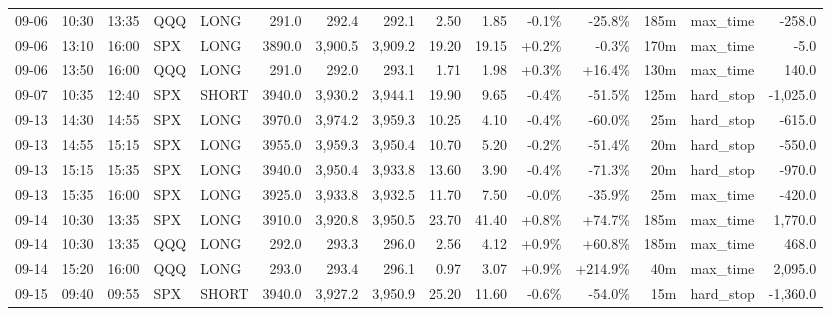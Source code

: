 \documentclass[11pt,a4paper,twoside]{article}
\begin{document}
\begin{landscape}
\begin{center}
\begin{longtable}{>{\color{txtmain}}l l l l l r r r r r r r r >{\color{txtmain}}l r}
09-06 & 10:30 & 13:35 & QQQ & LONG & 291.0 & 292.4 & 292.1 & 2.50 & 1.85 & \textcolor{lossred}{-0.1\%} & \textcolor{lossred}{-25.8\%} & 185m & max\_time & \textcolor{lossred}{-258.0} \\
09-06 & 13:10 & 16:00 & SPX & LONG & 3890.0 & 3,900.5 & 3,909.2 & 19.20 & 19.15 & \textcolor{wingreen}{+0.2\%} & \textcolor{lossred}{-0.3\%} & 170m & max\_time & \textcolor{lossred}{-5.0} \\
09-06 & 13:50 & 16:00 & QQQ & LONG & 291.0 & 292.0 & 293.1 & 1.71 & 1.98 & \textcolor{wingreen}{+0.3\%} & \textcolor{wingreen}{+16.4\%} & 130m & max\_time & \textcolor{wingreen}{140.0} \\
09-07 & 10:35 & 12:40 & SPX & SHORT & 3940.0 & 3,930.2 & 3,944.1 & 19.90 & 9.65 & \textcolor{lossred}{-0.4\%} & \textcolor{lossred}{-51.5\%} & 125m & hard\_stop & \textcolor{lossred}{-1,025.0} \\
09-13 & 14:30 & 14:55 & SPX & LONG & 3970.0 & 3,974.2 & 3,959.3 & 10.25 & 4.10 & \textcolor{lossred}{-0.4\%} & \textcolor{lossred}{-60.0\%} & 25m & hard\_stop & \textcolor{lossred}{-615.0} \\
09-13 & 14:55 & 15:15 & SPX & LONG & 3955.0 & 3,959.3 & 3,950.4 & 10.70 & 5.20 & \textcolor{lossred}{-0.2\%} & \textcolor{lossred}{-51.4\%} & 20m & hard\_stop & \textcolor{lossred}{-550.0} \\
09-13 & 15:15 & 15:35 & SPX & LONG & 3940.0 & 3,950.4 & 3,933.8 & 13.60 & 3.90 & \textcolor{lossred}{-0.4\%} & \textcolor{lossred}{-71.3\%} & 20m & hard\_stop & \textcolor{lossred}{-970.0} \\
09-13 & 15:35 & 16:00 & SPX & LONG & 3925.0 & 3,933.8 & 3,932.5 & 11.70 & 7.50 & \textcolor{lossred}{-0.0\%} & \textcolor{lossred}{-35.9\%} & 25m & max\_time & \textcolor{lossred}{-420.0} \\
09-14 & 10:30 & 13:35 & SPX & LONG & 3910.0 & 3,920.8 & 3,950.5 & 23.70 & 41.40 & \textcolor{wingreen}{+0.8\%} & \textcolor{wingreen}{+74.7\%} & 185m & max\_time & \textcolor{wingreen}{1,770.0} \\
09-14 & 10:30 & 13:35 & QQQ & LONG & 292.0 & 293.3 & 296.0 & 2.56 & 4.12 & \textcolor{wingreen}{+0.9\%} & \textcolor{wingreen}{+60.8\%} & 185m & max\_time & \textcolor{wingreen}{468.0} \\
09-14 & 15:20 & 16:00 & QQQ & LONG & 293.0 & 293.4 & 296.1 & 0.97 & 3.07 & \textcolor{wingreen}{+0.9\%} & \textcolor{wingreen}{+214.9\%} & 40m & max\_time & \textcolor{wingreen}{2,095.0} \\
09-15 & 09:40 & 09:55 & SPX & SHORT & 3940.0 & 3,927.2 & 3,950.9 & 25.20 & 11.60 & \textcolor{lossred}{-0.6\%} & \textcolor{lossred}{-54.0\%} & 15m & hard\_stop & \textcolor{lossred}{-1,360.0} \\

\end{longtable}
\end{center}
\end{landscape}
\end{document}
